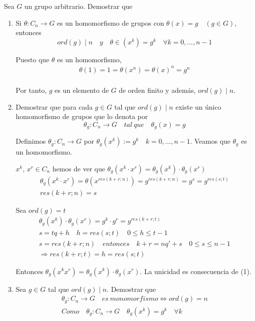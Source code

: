\documentclass{article}
\begin{document}
Sea $G$ un grupo arbitrario. Demostrar que 
\begin{enumerate}[(1)]
\item Si $\theta:C_n\longrightarrow G$ es un homomorfismo de grupos con $\theta(x)=g \quad (g\in G)$, entonces
\begin{equation*}
ord(g)\mid n \quad y \quad \theta \in (x^k)=g^k \quad \forall k=0,\ldots,n-1
\end{equation*}

Puesto que $\theta$ es un homomorfismo,
\begin{gather*}
\theta(1)=1=\theta(x^n)=\theta(x)^n=g^n\\
\end{gather*}

Por tanto, $g$ es un elemento de $G$ de orden finito y además, $ord(g)\mid n$. 

\item Demostrar que para cada $g\in G$ tal que $ord(g)\mid n$ existe un único homomorfismo de grupos que lo denota por
\begin{equation*}
\theta_g:C_n\longrightarrow G \quad tal\:que\quad \theta_g(x)=g
\end{equation*}

Definimos $\theta_g:C_n\longrightarrow G$ por $\theta_g(x^k):=g^k\quad k=0,\ldots,n-1$. Veamos que $\theta_g$ es un homomorfismo.

$x^k,\,x^r\in C_n$ hemos de ver que $\theta_g(x^k\cdot x^r)=\theta_g(x^k)\cdot \theta_g(x^r)$
\begin{gather*}
\theta_g(x^k\cdot x^r)=\theta(x^{res(k+r;n)})=g^{res(k+r;n)}=g^s=g^{res(s;t)} \\
res(k+r;n)=s
\end{gather*}

Sea $ord(g)=t$ 
\begin{gather*}
\theta_g(x^k)\cdot \theta_g(x^r)=g^k\cdot g^r=g^{res(k+r;t)} \\
s=tq+h\quad h=res(s;t)\quad 0\leq h\leq t-1 \\
s=res(k+r;n)\quad entonces\quad k+r=nq'+s \quad 0\leq s	\leq n-1 \\
\Rightarrow res(k+r;t)=h=res(s;t)
\end{gather*}

Entonces $\theta_g(x^kx^r)=\theta_g(x^k)\cdot \theta_g(x^r)$. La unicidad es consecuencia de (1).

\item Sea $g\in G$ tal que $ord(g)\mid n$. Demostrar que
\begin{gather*}
\theta_g:C_n\longrightarrow G\quad es\:monomorfismo\Leftrightarrow ord(g)=n\\
Como\quad \theta_g:C_n\longrightarrow G \quad \theta_g(x^k)=g^k\quad \forall k
\end{gather*}


\end{enumerate}
\end{document}
